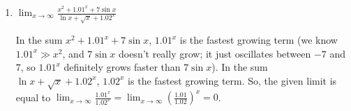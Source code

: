 \documentclass[main]{subfiles}
\begin{document}
\begin{enumerate}[resume]
\begin{enumerate}
    \begin{solution}      
      As $x \to -\infty$, $e^x \to 0$, so $x^2$ is the faster growing term
      in the sum $e^x + x^2$.  In the sum $7x^3 + 5$, $7x^3$ is the faster
      growing term, so the given limit is equal to $\displaystyle \lim_{x
        \to -\infty} \frac{x^2}{7x^3} = \lim_{x \to -\infty} \frac{1}{7x}
      = \boxed{0}$.
    \end{solution}

  \item

    \begin{problem}[\vfill\newpage]
      $\displaystyle \lim_{x \to \infty} \frac{x^2 + 1.01^x + 7 \sin
        x}{\ln x + \sqrt{x} + 1.02^x}$
    \end{problem}

    \begin{solution}
      In the sum $x^2 + 1.01^x + 7 \sin x$, $1.01^x$ is the fastest
      growing term (we know $1.01^x \gg x^2$, and $7 \sin x$ doesn't
      really grow; it just oscillates between $-7$ and $7$, so $1.01^x$
      definitely grows faster than $7 \sin x$).  In the sum $\ln x +
      \sqrt{x} + 1.02^x$, $1.02^x$ is the fastest growing term.  So, the
      given limit is equal to $\displaystyle \lim_{x \to \infty}
      \frac{1.01^x}{1.02^x} = \lim_{x \to \infty} \left( \frac{1.01}{1.02}
      \right)^x = \boxed{0}$. 
    \end{solution}

  \end{enumerate}





\end{enumerate}
\end{document}
